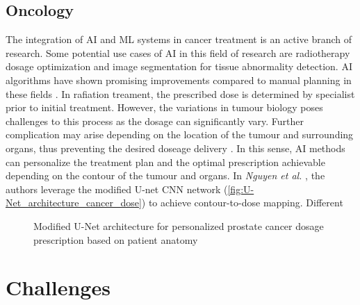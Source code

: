 \documentclass[a4paper]{article}
\begin{document}
\subsection{Oncology}
The integration of AI and ML systems in cancer treatment is an active branch of research.
Some potential use cases of AI in this field of research are radiotherapy dosage optimization and image segmentation for tissue abnormality detection. AI algorithms have shown promising improvements compared to manual planning in these fields \cite{thompson_artificial_2018}.
In rafiation treament, the prescribed dose is determined by specialist prior to initial treatment. However, the variations in tumour biology poses challenges to this process as the dosage can significantly vary. Further complication may arise depending on the location of the tumour and surrounding organs, thus preventing the desired doseage delivery \cite{huynh_artificial_2020}. In this sense, AI methods can personalize the treatment plan and the optimal prescription achievable depending on the contour of the tumour and organs.
In \textit{Nguyen et al.} \cite{}, the authors leverage the modified U-net CNN network (\autoref{fig:U-Net_architecture_cancer_dose}) to achieve contour-to-dose mapping. Different 

\begin{figure}[htbp]
    \caption{Modified U-Net architecture for personalized prostate cancer dosage prescription based on patient anatomy}
    \label{fig:U-Net_architecture_cancer_dose}
\end{figure}

\section{Challenges}
\end{document}
